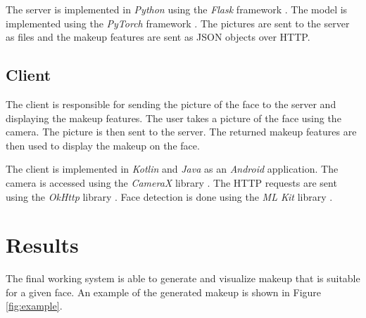 \documentclass[conference]{IEEEtran}
\begin{document}
The server is implemented in \emph{Python} using the \emph{Flask} framework \cite{flask}.
The model is implemented using the \emph{PyTorch} framework \cite{pytorch}.
The pictures are sent to the server as files and the makeup features are sent as JSON objects over HTTP.

\subsection{Client}

The client is responsible for sending the picture of the face to the server and displaying the makeup features.
The user takes a picture of the face using the camera.
The picture is then sent to the server.
The returned makeup features are then used to display the makeup on the face.

The client is implemented in \emph{Kotlin} and \emph{Java} as an \emph{Android} application.
The camera is accessed using the \emph{CameraX} library \cite{CameraX}.
The HTTP requests are sent using the \emph{OkHttp} library \cite{OkHttp}.
Face detection is done using the \emph{ML Kit} library \cite{mlkit}.

\section{Results} \label{sec:results}

The final working system is able to generate and visualize makeup that is suitable for a given face. An example of the generated makeup is shown in Figure \ref{fig:example}.
\end{document}
